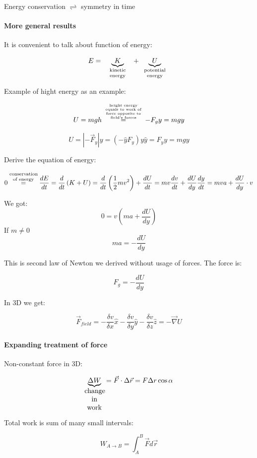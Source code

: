 \vspace{3mm}
\centerline{ \LARGE Energy conservation $\rightleftharpoons$ symmetry in time}

\paragraph{More general results} It is convenient to talk about function of energy:

$$E = \underbrace{K}_{\parbox{1.5cm}{\scriptsize \centering  kinetic energy}} + \underbrace{U}_{\parbox{1.5cm}{\scriptsize \centering  potential \\ energy}}$$

Example of hight energy as an example:

$$U = mgh \stackrel{\parbox{2cm}{\tiny \centering  height energy equals to work of force opposite to field's forces }}{=} -F_g y = mgy$$

$$U = \left| - \vec{F}_y \right| y =  (-\hat{y} F_y)y\hat{y} = F_y y = mgy$$


Derive the equation of energy:

$$0 \stackrel{\parbox{1.5cm}{\scriptsize \centering  conservation of energy}}{=} \frac{dE}{dt} = \frac{d}{dt}\left(K+U\right) = \frac{d}{dt}\left( \frac{1}{2} mv^2 \right) + \frac{dU}{dt} = mv\frac{dv}{dt} + \frac{dU}{dy}\frac{dy}{dt} = mva + \frac{dU}{dy} \cdot v$$

We got:
$$0 = v\left( ma  +\frac{dU}{dy} \right)$$
If $m \neq 0$
$$ma = - \frac{dU}{dy}$$

This is second law of Newton we derived without usage of forces. The force is:

$$F_g = - \frac{dU}{dy}$$

In 3D we get:

$$\vec{F}_{field} = -\frac{\delta v}{\delta x}\hat{x}-\frac{\delta v}{\delta y}\hat{y}-\frac{\delta v}{\delta z}\hat{z}=-\vec{\nabla}U$$

\paragraph{Expanding treatment of force} Non-constant force in 3D:

$$\underbrace{\Delta W}_{\parbox{1cm}{\centering change in work}} = \vec{F} \cdot \Delta \vec{r} = F \Delta r \cos \alpha$$

Total work is sum of many small intervals:

$$W_{A\to B} = \int_{A}^{B} \vec{F} d\vec{r}$$

